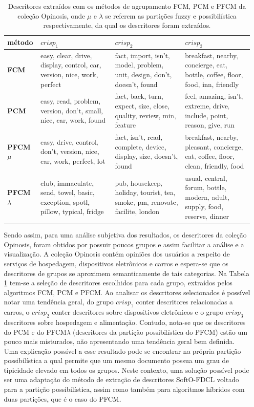 \begin{table}[!htp]
  \centering
  \begin{tabular}{ |l|p{4cm} | p{4cm} | p{4cm}|}
    \hline
    {\bf método} & $crisp_1$ & $crisp_2$ & $crisp_3$ \\
    \hline
    {\bf FCM} & easy, clear, drive, display, control, car, version, nice, work, perfect & fact,
    import, isn't, model, problem, unit, design, don't, doesn't, found & breakfast, nearby,
    concierge, eat, bottle, coffee, floor, food, inn, friendly \\
    \hline
    {\bf PCM} & easy, read, problem, version, don't, small, nice, car, work, found & fact, back,
    turn, expect, size, close, quality, review, min, feature & feel, amazing, isn't, extreme, drive,
    include, point, reason, give, run\\
    \hline
    {\bf PFCM $\mu$} & easy, drive, control, don't, version, nice, car, work, perfect, lot & fact,
    isn't, read, complete, device, display, size, doesn't, found & breakfast, nearby, pleasant,
    concierge, eat, coffee, floor, clean, friendly, food\\
    \hline
    {\bf PFCM $\lambda$} & club, immaculate, send, towel, basic, exception, spotl, pillow, typical,
    fridge & pub, housekeep, holiday, tourist, tea, smoke, pm, renovate, facilite, london & usual,
    central, forum, bottle, modern, adult, supply, food, reserve, dinner\\
    \hline
  \end{tabular}
  \caption{Descritores extraídos com os métodos de agrupamento FCM, PCM e PFCM da coleção Opinosis,
  onde $\mu$ e $\lambda$ se referem as partições fuzzy e possibilística respectivamente, da qual os
descritores foram extraídos.}
  \label{table:pfcmdescriptors}
\end{table}

Sendo assim, para uma análise subjetiva dos resultados, os descritores da coleção Opinosis, foram
obtidos por possuir poucos grupos e assim facilitar a análise e a visualização. A coleção Opinosis
contém opiniões dos usuários a respeito de serviços de hospedagem, dispositivos eletrônicos e carros
e espera-se que os descritores de grupos se aproximem semanticamente de tais categorias.  Na Tabela
\ref{table:pfcmdescriptors} tem-se a seleção de descritores escolhidos para cada grupo, extraídos
pelos algoritmos FCM, PCM e PFCM. Ao analisar os descritores selecionados é possível notar uma
tendência geral, do grupo $crisp_1$ conter descritores relacionadas a carros, o $crisp_2$ conter
descritores sobre dispositivos eletrônicos e o grupo $crisp_3$ descritores sobre hospedagem e
alimentação. Contudo, nota-se que os descritores do PCM e do PFCM$\lambda$ (descritores da partição
possibilística do PFCM) estão um pouco mais misturados, não apresentando uma tendência geral bem
definida. Uma explicação possível a esse resultado pode se encontrar na própria partição
possibilística a qual permite que um mesmo documento possua um grau de tipicidade elevado em todos
os grupos. Neste contexto, uma solução possível pode ser uma adaptação do método de extração de
descritores SoftO-FDCL voltado para a partição possibilística, assim como também para algoritmos
híbridos com duas partições, que é o caso do PFCM.


